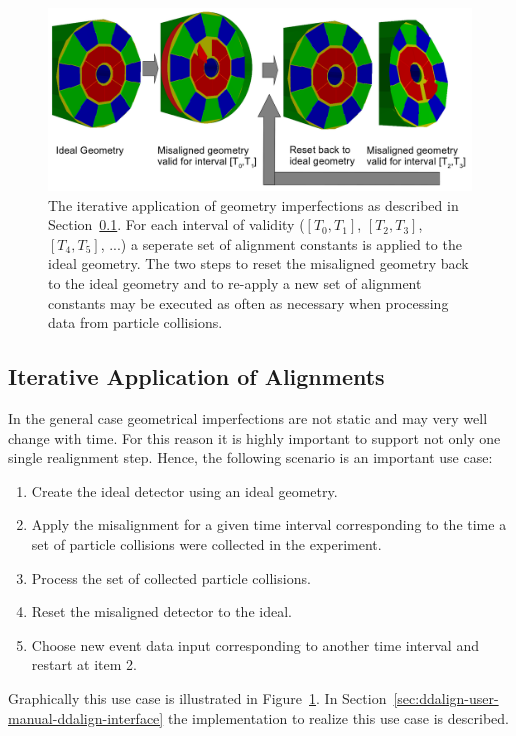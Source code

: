 \documentclass[10pt,a4paper]{article}
\begin{document}
\begin{figure}[t]
  \begin{center}
    \includegraphics[width=160mm] {DDAlign-iterative-misalignment.png}
    \caption{The iterative application of geometry imperfections as described
    in Section~\ref{subsect:ddalign-intro-iterative-alignments}.
    For each interval of validity ($[T_0,T_1]$, $[T_2,T_3]$, $[T_4,T_5]$, ...)
    a seperate set of alignment constants is applied to the ideal geometry.
    The two steps to reset the misaligned geometry back to the ideal geometry and
    to re-apply a new set of alignment constants may be executed as 
    often as necessary when processing data from particle collisions.}
    \label{fig:ddalign-aligned-iterative}
  \end{center}
\end{figure}

\newpage
\subsection{Iterative Application of Alignments}
\label{subsect:ddalign-intro-iterative-alignments}
\noindent
In the general case geometrical imperfections are not static and may very 
well change with time. For this reason it is highly important to support 
not only one single realignment step.
Hence, the following scenario is an important use case:
\begin{enumerate}\itemcompact
\item Create the ideal detector using an ideal geometry.
\item Apply the misalignment for a given time interval corresponding to the 
    time a set of particle collisions were collected in the experiment.
\item Process the set of collected particle collisions.
\item Reset the misaligned detector to the ideal.
\item Choose new event data input corresponding to another time interval
    and restart at item 2.
\end{enumerate}
Graphically this use case is illustrated in 
Figure~\ref{fig:ddalign-aligned-iterative}. In 
Section~\ref{sec:ddalign-user-manual-ddalign-interface} the implementation 
to realize this use case is described.
\end{document}
